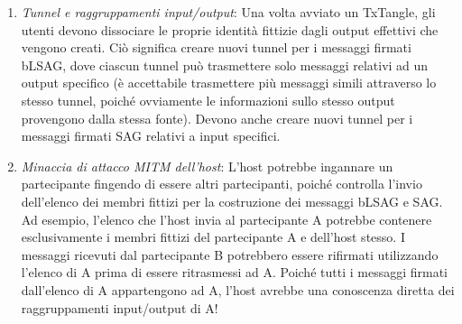\begin{enumerate}
    \item \emph{Tunnel e raggruppamenti input/output}: Una volta avviato un TxTangle, gli utenti devono dissociare le proprie identità fittizie dagli output effettivi che vengono creati. Ciò significa creare nuovi tunnel per i messaggi firmati bLSAG, dove ciascun tunnel può trasmettere solo messaggi relativi ad un output specifico (è accettabile trasmettere più messaggi simili attraverso lo stesso tunnel, poiché ovviamente le informazioni sullo stesso output provengono dalla stessa fonte). Devono anche creare nuovi tunnel per i messaggi firmati SAG relativi a input specifici.
    \item \emph{Minaccia di attacco MITM dell'host}: L'host potrebbe ingannare un partecipante fingendo di essere altri partecipanti, poiché controlla l'invio dell'elenco dei membri fittizi per la costruzione dei messaggi bLSAG e SAG. Ad esempio, l'elenco che l'host invia al partecipante A potrebbe contenere esclusivamente i membri fittizi del partecipante A e dell'host stesso. I messaggi ricevuti dal partecipante B potrebbero essere rifirmati utilizzando l'elenco di A prima di essere ritrasmessi ad A. Poiché tutti i messaggi firmati dall'elenco di A appartengono ad A, l'host avrebbe una conoscenza diretta dei raggruppamenti input/output di A! 
    

\end{enumerate}
